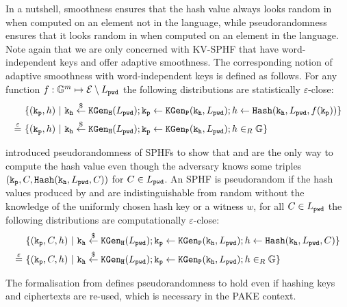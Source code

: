 \noindent
In a nutshell, smoothness ensures that the hash value always looks random in \GG when computed on an element not in the language, while pseudorandomness ensures that it looks random in \GG when computed on an element in the language.
Note again that we are only concerned with KV-SPHF that have word-independent keys and offer adaptive smoothness.
The corresponding notion of adaptive smoothness with word-independent keys is defined as follows.
For any function $f:\mathbb{G}^m \mapsto \mathcal{E}\setminus L_\mathtt{pwd}$ the following distributions are statistically $\varepsilon$-close:
\begin{align*}
& \{(\mathtt{k_p},h) ~|~ \mathtt{k_h}\stackrel{\$}{\gets}\mathtt{KGen_H}(L_\mathtt{pwd}); \mathtt{k_p}\gets\mathtt{KGen_P}(\mathtt{k_h},L_\mathtt{pwd}); h\gets\mathtt{Hash}(\mathtt{k_h},L_\mathtt{pwd},f(\mathtt{k_p}))\} \\
\stackrel{\varepsilon}{=}~ & \{(\mathtt{k_p},h) ~|~ \mathtt{k_h}\stackrel{\$}{\gets}\mathtt{KGen_H}(L_\mathtt{pwd}); \mathtt{k_p}\gets\mathtt{KGen_P}(\mathtt{k_h},L_\mathtt{pwd}); h\in_R\mathbb{G}\}
\end{align*}

\noindent
\citet{Gennaro2003} introduced pseudorandomness of \acp{SPHF} to show that \Hash and \PHash are the only way to compute the hash value even though the adversary knows some triples $(\mathtt{k_p},C,\mathtt{Hash}(\mathtt{k_h},\allowbreak L_\mathtt{pwd},C))$ for $C\in L_\mathtt{pwd}$.
An \ac{SPHF} is pseudorandom if the hash values produced by \Hash and \PHash are indistinguishable from random without the knowledge of the uniformly chosen hash key \hk or a witness $w$, \ie for all $C\in L_\mathtt{pwd}$ the following distributions are computationally $\varepsilon$-close:
\begin{align*}
& \{(\mathtt{k_p},C,h) ~|~ \mathtt{k_h}\stackrel{\$}{\gets}\mathtt{KGen_H}(L_\mathtt{pwd}); \mathtt{k_p}\gets\mathtt{KGen_P}(\mathtt{k_h},L_\mathtt{pwd}); h\gets\mathtt{Hash}(\mathtt{k_h},L_\mathtt{pwd},C)\} \\
\stackrel{\varepsilon}{=}~ & \{(\mathtt{k_p},C,h) ~|~ \mathtt{k_h}\stackrel{\$}{\gets}\mathtt{KGen_H}(L_\mathtt{pwd}); \mathtt{k_p}\gets\mathtt{KGen_P}(\mathtt{k_h},L_\mathtt{pwd}); h\in_R\mathbb{G}\}
\end{align*}

\noindent
The formalisation from \citet{Katz2011} defines pseudorandomness to hold even if hashing keys and ciphertexts are re-used, which is necessary in the \ac{PAKE} context.


